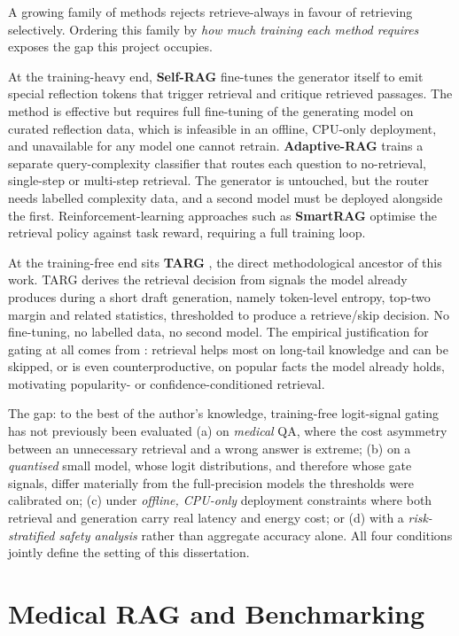 A growing family of methods rejects retrieve-always in favour of retrieving
selectively. Ordering this family by \emph{how much training each method
requires} exposes the gap this project occupies.

At the training-heavy end, \textbf{Self-RAG} \citep{selfrag2024} fine-tunes
the generator itself to emit special reflection tokens that trigger retrieval
and critique retrieved passages. The method is effective but requires full
fine-tuning of the generating model on curated reflection data, which is
infeasible
in an offline, CPU-only deployment, and unavailable for any model one cannot
retrain. \textbf{Adaptive-RAG} \citep{adaptiverag2024} trains a separate
query-complexity classifier that routes each question to no-retrieval,
single-step or multi-step retrieval. The generator is untouched, but the
router needs labelled complexity data, and a second model must be deployed
alongside the first. Reinforcement-learning approaches such as
\textbf{SmartRAG} \citep{smartrag2025} optimise the retrieval policy against
task reward, requiring a full training loop.

At the training-free end sits \textbf{TARG} \citep{targ2025}, the direct
methodological ancestor of this work. TARG derives the retrieval decision
from signals the model already produces during a short draft generation,
namely token-level entropy, top-two margin and related statistics, thresholded to
produce a retrieve/skip decision. No fine-tuning, no labelled data, no second
model. The empirical justification for gating at all comes from
\citet{mallen2023}: retrieval helps most on long-tail knowledge and can be
skipped, or is even counterproductive, on popular facts the model
already holds, motivating popularity- or confidence-conditioned retrieval.

The gap: to the best of the author's knowledge, training-free logit-signal
gating has not previously been evaluated (a) on \emph{medical} QA, where the
cost asymmetry between an unnecessary retrieval and a wrong answer is
extreme; (b) on a \emph{quantised} small model, whose logit distributions,
and therefore whose gate signals, differ materially from the
full-precision models the thresholds were calibrated on; (c) under
\emph{offline, CPU-only} deployment constraints where both retrieval and
generation carry real latency and energy cost; or (d) with a
\emph{risk-stratified safety analysis} rather than aggregate accuracy alone.
All four conditions jointly define the setting of this dissertation.

\section{Medical RAG and Benchmarking}
\label{sec:bg-medical}

